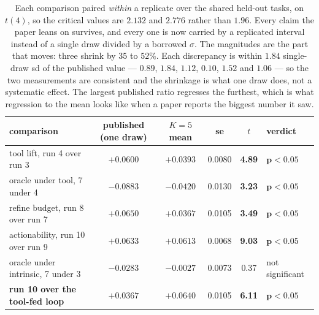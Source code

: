 \documentclass[11pt]{article}
\begin{document}
\begin{table}[h]
\centering
\small
\begin{tabular}{lccccl}
\toprule
comparison & published (one draw) & $K{=}5$ mean & se & $t$ & verdict \\
\midrule
tool lift, run 4 over run 3      & $+0.0600$ & $+0.0393$ & 0.0080 & \textbf{4.89} & $\mathbf{p<0.05}$ \\
oracle under tool, 7 under 4     & $-0.0883$ & $-0.0420$ & 0.0130 & \textbf{3.23} & $\mathbf{p<0.05}$ \\
refine budget, run 8 over run 7  & $+0.0650$ & $+0.0367$ & 0.0105 & \textbf{3.49} & $\mathbf{p<0.05}$ \\
actionability, run 10 over run 9 & $+0.0633$ & $+0.0613$ & 0.0068 & \textbf{9.03} & $\mathbf{p<0.05}$ \\
oracle under intrinsic, 7 under 3 & $-0.0283$ & $-0.0027$ & 0.0073 & 0.37 & not significant \\
\textbf{run 10 over the tool-fed loop} & $+0.0367$ & $\mathbf{+0.0640}$ & 0.0105 & \textbf{6.11} & $\mathbf{p<0.05}$ \\
\bottomrule
\end{tabular}
\caption{Each comparison paired \emph{within} a replicate over the shared held-out tasks, on
$t(4)$, so the critical values are $2.132$ and $2.776$ rather than $1.96$. Every claim the paper
leans on survives, and every one is now carried by a replicated interval instead of a single draw
divided by a borrowed $\sigma$. The magnitudes are the part that moves: three shrink by $35$ to
$52\%$. Each discrepancy is within $1.84$ single-draw sd of the published value --- $0.89$, $1.84$,
$1.12$, $0.10$, $1.52$ and $1.06$ --- so the two measurements are consistent and the shrinkage is
what one draw does, not a systematic effect. The largest published ratio regresses the furthest,
which is what regression to the mean looks like when a paper reports the biggest number it saw.}
\label{tab:curvepairs}
\end{table}
\end{document}
